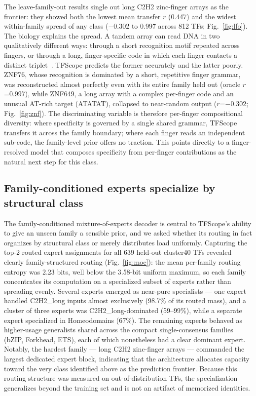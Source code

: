 \documentclass[11pt,letterpaper]{article}
\begin{document}
The leave-family-out results single out long C2H2 zinc-finger arrays as the
frontier: they showed both the lowest mean transfer $r$ (0.447) and the widest
within-family spread of any class ($-$0.302 to 0.997 across 812 TFs;
Fig.~\ref{fig:lfo}). The biology explains the spread. A tandem array can read DNA in
two qualitatively different ways: through a short recognition motif repeated across
fingers, or through a long, finger-specific code in which each finger contacts a
distinct triplet~\cite{Wolfe2000,Najafabadi2015}. TFScope predicts the former
accurately and the latter poorly. ZNF76, whose recognition is dominated by a short,
repetitive finger grammar, was reconstructed almost perfectly even with its entire
family held out (oracle $r$=0.997), while ZNF649, a long array with a complex
per-finger code and an unusual AT-rich target (ATATAT), collapsed to near-random
output ($r$=$-$0.302; Fig.~\ref{fig:znf}). The discriminating variable is therefore
per-finger compositional diversity: where specificity is governed by a single shared
grammar, TFScope transfers it across the family boundary; where each finger reads an
independent sub-code, the family-level prior offers no traction. This points
directly to a finger-resolved model that composes specificity from per-finger
contributions as the natural next step for this class.

\subsection*{Family-conditioned experts specialize by structural class}

The family-conditioned mixture-of-experts decoder is central to TFScope's ability
to give an unseen family a sensible prior, and we asked whether its routing in fact
organizes by structural class or merely distributes load uniformly. Capturing the
top-2 routed expert assignments for all 639 held-out cluster40 TFs revealed clearly
family-structured routing (Fig.~\ref{fig:moe}): the mean per-family routing entropy
was 2.23 bits, well below the 3.58-bit uniform maximum, so each family concentrates
its computation on a specialized subset of experts rather than spreading evenly.
Several experts emerged as near-pure specialists — one expert handled C2H2\_long
inputs almost exclusively (98.7\% of its routed mass), and a cluster of three
experts was C2H2\_long-dominated (59--99\%), while a separate expert specialized in
Homeodomains (67\%). The remaining experts behaved as higher-usage generalists
shared across the compact single-consensus families (bZIP, Forkhead, ETS), each of
which nonetheless had a clear dominant expert. Notably, the hardest family — long
C2H2 zinc-finger arrays — commanded the largest dedicated expert block, indicating
that the architecture allocates capacity toward the very class identified above as
the prediction frontier. Because this routing structure was measured on
out-of-distribution TFs, the specialization generalizes beyond the training set and
is not an artifact of memorized identities.
\end{document}
